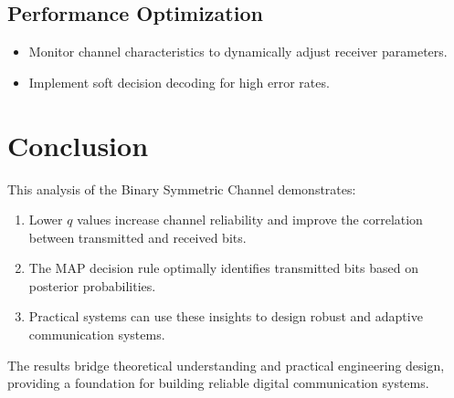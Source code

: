 \documentclass[a4paper,11pt]{article}
\begin{document}
\subsection{Performance Optimization}
\begin{itemize}
    \item Monitor channel characteristics to dynamically adjust receiver parameters.
    \item Implement soft decision decoding for high error rates.
\end{itemize}

 

\section{Conclusion}
This analysis of the Binary Symmetric Channel demonstrates:
\begin{enumerate}
    \item Lower $q$ values increase channel reliability and improve the correlation between transmitted and received bits.
    \item The MAP decision rule optimally identifies transmitted bits based on posterior probabilities.
    \item Practical systems can use these insights to design robust and adaptive communication systems.
\end{enumerate}
The results bridge theoretical understanding and practical engineering design, providing a foundation for building reliable digital communication systems.
\end{document}
